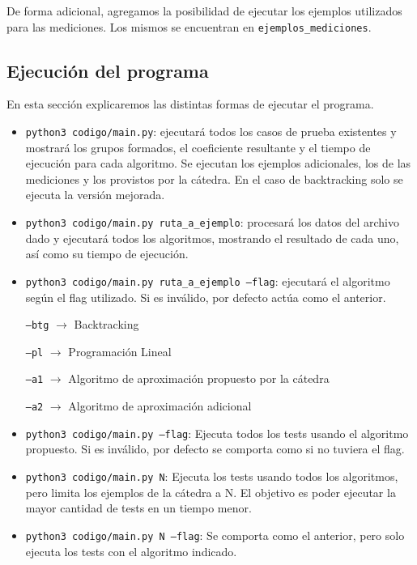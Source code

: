 \documentclass{article}
\begin{document}
De forma adicional, agregamos la posibilidad de ejecutar los ejemplos utilizados para las mediciones. Los mismos se encuentran en \texttt{ejemplos\_mediciones}. 

\subsection{Ejecución del programa}

En esta sección explicaremos las distintas formas de ejecutar el programa.
\begin{itemize}
    \item \texttt{python3\ codigo/main.py}: ejecutará todos los casos de prueba existentes y mostrará los grupos formados, el coeficiente resultante y el tiempo de ejecución para cada algoritmo. Se ejecutan los ejemplos adicionales, los de las mediciones y los provistos por la cátedra. En el caso de backtracking solo se ejecuta la versión mejorada.
    \item \texttt{python3\ codigo/main.py\ ruta\_a\_ejemplo}: procesará los datos del archivo dado y ejecutará todos los algoritmos, mostrando el resultado de cada uno, así como su tiempo de ejecución. 
    \item \texttt{python3\ codigo/main.py ruta\_a\_ejemplo\ --flag}: ejecutará el algoritmo según el flag utilizado. Si es inválido, por defecto actúa como el anterior.

        \texttt{--btg} $\rightarrow$ Backtracking
        
        \texttt{--pl} $\rightarrow$ Programación Lineal
        
        \texttt{--a1} $\rightarrow$ Algoritmo de aproximación propuesto por la cátedra
        
        \texttt{--a2} $\rightarrow$ Algoritmo de aproximación adicional
    \item \texttt{python3\ codigo/main.py\ --flag}: Ejecuta todos los tests usando el algoritmo propuesto. Si es inválido, por defecto se comporta como si no tuviera el flag.

    \item \texttt{python3\ codigo/main.py\ N}: Ejecuta los tests usando todos los algoritmos, pero limita los ejemplos de la cátedra a N. El objetivo es poder ejecutar la mayor cantidad de tests en un tiempo menor.

    \item \texttt{python3\ codigo/main.py\ N\ --flag}: Se comporta como el anterior, pero solo ejecuta los tests con el algoritmo indicado.
        
\end{itemize}
\end{document}
